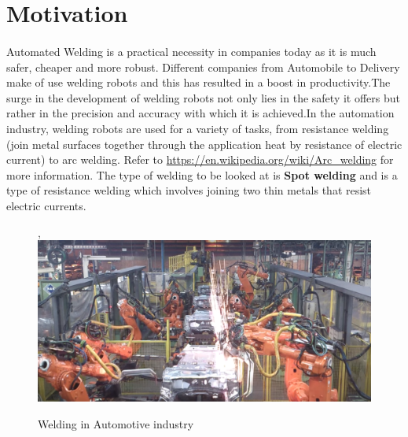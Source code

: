 \documentclass[12pt]{article}
\begin{document}

\tableofcontents
\pagebreak


\section{Motivation}
\paragraph{}
Automated Welding is a practical necessity in companies today as it is much safer, cheaper and more robust. Different companies
from Automobile to Delivery make of use welding robots and this has resulted in a boost in 
productivity.The surge in 
the development of welding robots not only lies in the safety it offers but rather in the precision and accuracy with which it is achieved.In the automation industry,
welding robots are used for a variety 
of tasks, from resistance welding (join metal surfaces together
through the application 
heat by resistance of electric current) to arc welding. Refer to \url{https://en.wikipedia.org/wiki/Arc_welding} for 
more information. The type of welding to be looked at is \textbf{Spot welding} and is a type of resistance welding which 
involves joining two thin metals that resist electric currents.

\begin{figure}[H],
    \centering
    \includegraphics[scale = 0.2]{welding.png}\\[0.0 cm]	%
    \caption{Welding in Automotive industry} 
\end{figure}
\end{document}
